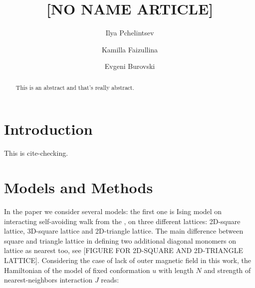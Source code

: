 \documentclass[aps,pre,amssymb,amsmath,twocolumn,floatfix]{revtex4-2}
\begin{document}
\title{[NO NAME ARTICLE]}

\author{Ilya Pchelintsev}
\author{Kamilla Faizullina}
\author{Evgeni Burovski}



\begin{abstract}
    This is an abstract and that's really abstract.
\end{abstract}

\maketitle

\section{Introduction}
This is cite-checking.\cite{Papale2018}

\section{Models and Methods}
In the paper we consider several models: the first one is Ising model on interacting self-avoiding walk from the \cite{faizullina2021critical}, on three different lattices: 2D-square lattice, 3D-square lattice and 2D-triangle lattice. The main difference between square and triangle lattice in defining two additional diagonal monomers on lattice as nearest too, see [FIGURE FOR 2D-SQUARE AND 2D-TRIANGLE LATTICE]. Considering the case of lack of outer magnetic field in this work, the Hamiltonian of the model of fixed conformation $u$ with length $N$ and strength of nearest-neighbors interaction $J$ reads:
\end{document}
